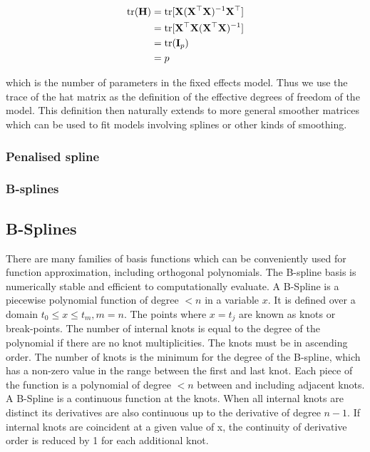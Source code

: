 \begin{align*}
	\text{tr}({\bf H}) & = \text{tr}[{\bf X}({\bf X}^\top{\bf X})^{-1}{\bf X}^\top]  \\
	         & = \text{tr}[{\bf X}^\top{\bf X} ({\bf X}^\top{\bf X})^{-1}] \\
	         & = \text{tr}({\bf I}_p)                          \\
	         & = p                                   
\end{align*}

which is the number of parameters in the fixed effects model. Thus we use the trace of the hat matrix as
the definition of the effective degrees of freedom of the model. This definition then naturally extends to
more general smoother matrices which can be used to fit models involving splines or other kinds of smoothing.

\subsubsection{Penalised spline}
\subsubsection{B-splines}
\subsection{B-Splines}
There are many families of basis functions which can be conveniently used for function approximation,
including orthogonal polynomials.
The B-spline basis \citep{DeBoor1972} is numerically stable and efficient to computationally evaluate.
A B-Spline is a piecewise polynomial function of degree $< n$ in a variable $x$.
It is defined over a
domain $t_0 \leq x \leq t_m, m=n$. The points where $x = t_j$ are known as knots or break-points. The
number of internal knots is equal to the degree of the polynomial if there are no knot multiplicities.
The knots must be in ascending order. The number of knots is the minimum for the degree of the B-spline,
which has a non-zero value in the range between the first and last knot. Each piece of the function is a
polynomial of degree $< n$ between and including adjacent knots. A B-Spline is a continuous function at the
knots. When all internal knots are distinct its derivatives are also continuous up to the derivative of degree
$n - 1$. If internal knots are coincident at a given value of x, the continuity of derivative order is reduced
by 1 for each additional knot.

